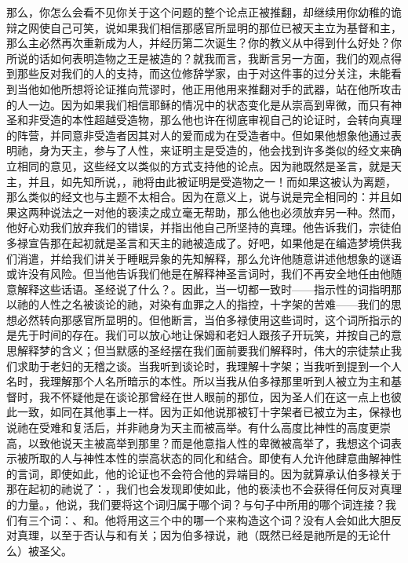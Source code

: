 那么，你怎么会看不见你关于这个问题的整个论点正被推翻，却继续用你幼稚的诡辩之网使自己可笑，说如果我们相信那感官所显明的那位已被天主立为基督和主，那么主必然再次重新成为人，并经历第二次诞生？你的教义从中得到什么好处？你所说的话如何表明造物之王是被造的？就我而言，我断言另一方面，我们的观点得到那些反对我们的人的支持，而这位修辞学家，由于对这件事的过分关注，未能看到当他如他所想将论证推向荒谬时，他正用他用来推翻对手的武器，站在他所攻击的人一边。因为如果我们相信耶稣的情况中的状态变化是从崇高到卑微，而只有神圣和非受造的本性超越受造物，那么他也许在彻底审视自己的论证时，会转向真理的阵营，并同意非受造者因其对人的爱而成为在受造者中。但如果他想象他通过表明祂，身为天主，参与了人性，来证明主是受造的，他会找到许多类似的经文来确立相同的意见，这些经文以类似的方式支持他的论点。因为祂既然是圣言，就是天主，并且，如先知所说，，祂将由此被证明是受造物之一！而如果这被认为离题，那么类似的经文也与主题不太相合。因为在意义上，说与说是完全相同的：并且如果这两种说法之一对他的亵渎之成立毫无帮助，那么他也必须放弃另一种。然而，他好心劝我们放弃我们的错误，并指出他自己所坚持的真理。他告诉我们，宗徒伯多禄宣告那在起初就是圣言和天主的祂被造成了。好吧，如果他是在编造梦境供我们消遣，并给我们讲关于睡眠异象的先知解释，那么允许他随意讲述他想象的谜语或许没有风险。但当他告诉我们他是在解释神圣言词时，我们不再安全地任由他随意解释这些话语。圣经说了什么？。因此，当一切都一致时——指示性的词指明那以祂的人性之名被谈论的祂，对染有血罪之人的指控，十字架的苦难——我们的思想必然转向那感官所显明的。但他断言，当伯多禄使用这些词时，这个词所指示的是先于时间的存在。我们可以放心地让保姆和老妇人跟孩子开玩笑，并按自己的意思解释梦的含义；但当默感的圣经摆在我们面前要我们解释时，伟大的宗徒禁止我们求助于老妇的无稽之谈。当我听到谈论时，我理解十字架；当我听到提到一个人名时，我理解那个人名所暗示的本性。所以当我从伯多禄那里听到人被立为主和基督时，我不怀疑他是在谈论那曾经在世人眼前的那位，因为圣人们在这一点上也彼此一致，如同在其他事上一样。因为正如他说那被钉十字架者已被立为主，保禄也说祂在受难和复活后，并非祂身为天主而被高举。有什么高度比神性的高度更崇高，以致他说天主被高举到那里？而是他意指人性的卑微被高举了，我想这个词表示被所取的人与神性本性的崇高状态的同化和结合。即使有人允许他肆意曲解神性的言词，即使如此，他的论证也不会符合他的异端目的。因为就算承认伯多禄关于那在起初的祂说了：，我们也会发现即使如此，他的亵渎也不会获得任何反对真理的力量。，他说，我们要将这个词归属于哪个词？与句子中所用的哪个词连接？我们有三个词：、和。他将用这三个中的哪一个来构造这个词？没有人会如此大胆反对真理，以至于否认与和有关；因为伯多禄说，祂（既然已经是祂所是的无论什么）被圣父。\par

